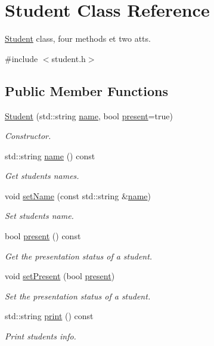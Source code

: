 \hypertarget{classStudent}{}\section{Student Class Reference}
\label{classStudent}


\hyperlink{classStudent}{Student} class, four methods et two atts.  




{\ttfamily \#include $<$student.\+h$>$}

\subsection*{Public Member Functions}
\begin{DoxyCompactItemize}
\item 
\hyperlink{classStudent_ababb9f66a55e7ad87a5c5a6be6dda069}{Student} (std\+::string \hyperlink{classStudent_a1d89c28bd42ba9a52da008bb69367171}{name}, bool \hyperlink{classStudent_a110ce4aee2c3c5912933d8e8aa70cc1e}{present}=true)
\begin{DoxyCompactList}\small\item\em Constructor. \end{DoxyCompactList}\item 
std\+::string \hyperlink{classStudent_a1d89c28bd42ba9a52da008bb69367171}{name} () const
\begin{DoxyCompactList}\small\item\em Get students\textquotesingle{} names. \end{DoxyCompactList}\item 
void \hyperlink{classStudent_a9d3a2685df23b5e7cbf59c19c4a1f9b5}{set\+Name} (const std\+::string \&\hyperlink{classStudent_a1d89c28bd42ba9a52da008bb69367171}{name})
\begin{DoxyCompactList}\small\item\em Set student\textquotesingle{}s name. \end{DoxyCompactList}\item 
bool \hyperlink{classStudent_a110ce4aee2c3c5912933d8e8aa70cc1e}{present} () const
\begin{DoxyCompactList}\small\item\em Get the presentation status of a student. \end{DoxyCompactList}\item 
void \hyperlink{classStudent_a4b5a0a2d5e64a49f91f50c790ae3147a}{set\+Present} (bool \hyperlink{classStudent_a110ce4aee2c3c5912933d8e8aa70cc1e}{present})
\begin{DoxyCompactList}\small\item\em Set the presentation status of a student. \end{DoxyCompactList}\item 
std\+::string \hyperlink{classStudent_acd848ed8bb05466e6d96bd387a8326c2}{print} () const
\begin{DoxyCompactList}\small\item\em Print students\textquotesingle{} info. \end{DoxyCompactList}\end{DoxyCompactItemize}

